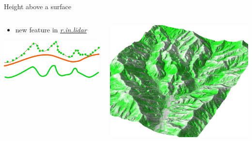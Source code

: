\documentclass[xcolor={dvipsnames,usenames},beamer,aspectratio=169]{beamer}
\newcommand{\gmodule}[1]{\href{http://grass.osgeo.org/grass71/manuals/#1.html}{\emph{#1}}}
\begin{document}
\begin{frame}{Height above a surface}

\begin{columns}
\begin{column}{0.4\textwidth}

\begin{itemize}
  \item new feature in \gmodule{r.in.lidar}
\end{itemize}

\begin{center}
\includegraphics[width=\textwidth]{images/features/base_raster}
\end{center}

\end{column}
\begin{column}{0.55\textwidth}

\begin{center}
  \includegraphics[width=\textwidth]{grass/max_height_10m_on_ground_from_neighbors_smaller_area_top}
\end{center}

\end{column}
\end{columns}

\end{frame}
\end{document}
